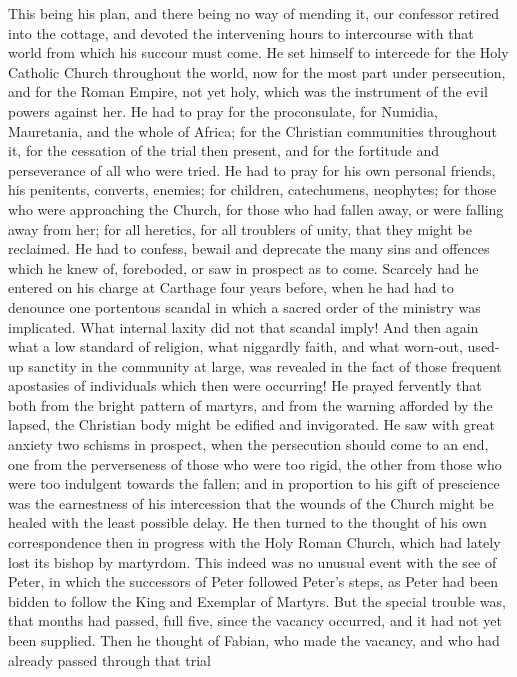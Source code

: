 This being his plan, and there being no way of mending it, our
confessor retired into the cottage, and devoted the intervening hours
to intercourse with that world from which his succour must come. He
set himself to intercede for the Holy Catholic Church throughout the
world, now for the most part under persecution, and for the Roman
Empire, not yet holy, which was the instrument of the evil powers
against her. He had to pray for the proconsulate, for Numidia,
Mauretania, and the whole of Africa; for the Christian communities
throughout it, for the cessation of the trial then present, and for
the fortitude and perseverance of all who were tried. He had to pray
for his own personal friends, his penitents, converts, enemies;
for children, catechumens, neophytes; for those who were approaching
the Church, for those who had fallen away, or were falling away from
her; for all heretics, for all troublers of unity, that they might be
reclaimed. He had to confess, bewail and deprecate the many sins and
offences which he knew of, foreboded, or saw in prospect as to come.
Scarcely had he entered on his charge at Carthage four years before,
when he had had to denounce one portentous scandal in which a sacred
order of the ministry was implicated. What internal laxity did not
that scandal imply! And then again what a low standard of religion,
what niggardly faith, and what worn-out, used-up sanctity in the
community at large, was revealed in the fact of those frequent
apostasies of individuals which then were occurring! He prayed
fervently that both from the bright pattern of martyrs, and from the
warning afforded by the lapsed, the Christian body might be edified
and invigorated. He saw with great anxiety two schisms in prospect,
when the persecution should come to an end, one from the perverseness
of those who were too rigid, the other from those who were too
indulgent towards the fallen; and in proportion to his gift of
prescience was the earnestness of his intercession that the wounds of
the Church might be healed with the least possible delay. He then
turned to the thought of his own correspondence then in progress with
the Holy Roman Church, which had lately lost its bishop by martyrdom.
This indeed was no unusual event with the see of Peter, in which
the successors of Peter followed Peter's steps, as Peter had been
bidden to follow the King and Exemplar of Martyrs. But the special
trouble was, that months had passed, full five, since the vacancy
occurred, and it had not yet been supplied. Then he thought of Fabian,
who made the vacancy, and who had already passed through that trial
